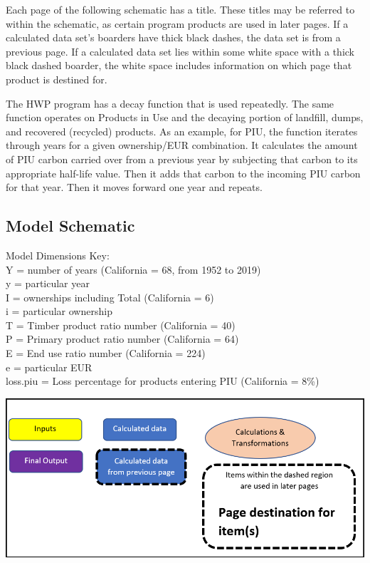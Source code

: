 \documentclass[
]{book}
\begin{document}
Each page of the following schematic has a title. These titles may be referred to within the schematic, as certain program products are used in later pages. If a calculated data set's boarders have thick black dashes, the data set is from a previous page. If a calculated data set lies within some white space with a thick black dashed boarder, the white space includes information on which page that product is destined for.

The HWP program has a decay function that is used repeatedly. The same function operates on Products in Use and the decaying portion of landfill, dumps, and recovered (recycled) products. As an example, for PIU, the function iterates through years for a given ownership/EUR combination. It calculates the amount of PIU carbon carried over from a previous year by subjecting that carbon to its appropriate half-life value. Then it adds that carbon to the incoming PIU carbon for that year. Then it moves forward one year and repeats.

\newpage

\hypertarget{model-func-schem}{%
\subsection{Model Schematic}\label{model-func-schem}}

Model Dimensions Key:\\
Y = number of years (California = 68, from 1952 to 2019)\\
y = particular year\\
I = ownerships including Total (California = 6)\\
i = particular ownership\\
T = Timber product ratio number (California = 40)\\
P = Primary product ratio number (California = 64)\\
E = End use ratio number (California = 224)\\
e = particular EUR\\
loss.piu = Loss percentage for products entering PIU (California = 8\%)

\includegraphics[width=1\linewidth]{images/schematic-0}
\end{document}
